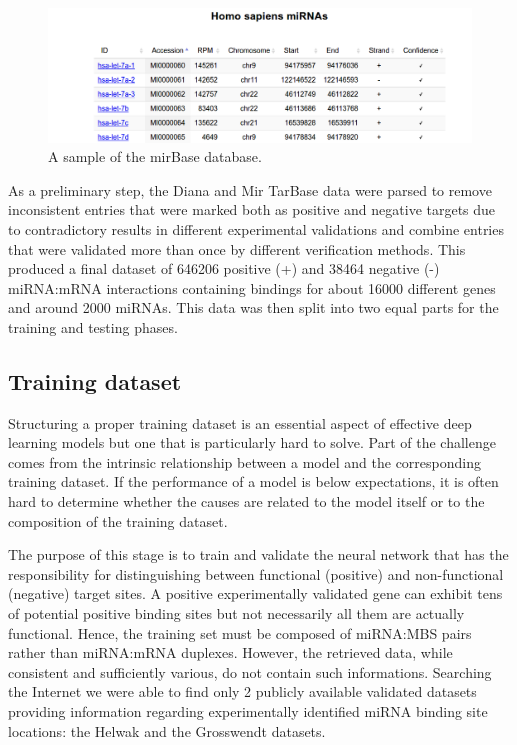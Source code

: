 \begin{figure}[hbt!]
	\centering
	\includegraphics[width=1\textwidth, height=0.3\textheight]{Figures/mirna_preview}
	\caption{A sample of the mirBase database.}
	\label{fig:mirna_preview}
\end{figure}

As a preliminary step, the Diana and Mir TarBase data were parsed to remove inconsistent entries that were marked both as positive and negative targets due to contradictory results in different experimental validations and combine entries that were validated more than once by different verification methods. This produced a final dataset of 646206 positive (+) and 38464 negative (-) miRNA:mRNA interactions containing bindings for about 16000 different genes and around 2000 miRNAs. This data was then split into two equal parts for the training and testing phases. 

\subsection{Training dataset}
Structuring a proper training dataset is an essential aspect of effective deep learning models but one that is particularly hard to solve. Part of the challenge comes from the intrinsic relationship between a model and the corresponding training dataset. If the performance of a model is below expectations, it is often hard to determine whether the causes are related to the model itself or to the composition of the training dataset.

The purpose of this stage is to train and validate the neural network that has the responsibility for distinguishing between functional (positive) and non-functional (negative) target sites. A positive experimentally validated gene can exhibit tens of potential positive binding sites  but not necessarily  all them are actually functional. Hence, the training set must be composed of miRNA:MBS pairs rather than miRNA:mRNA duplexes. However, the retrieved data, while consistent and sufficiently various, do not contain such informations. Searching the Internet we were able to find only 2 publicly available validated datasets providing information regarding experimentally identified miRNA binding site locations: the Helwak \cite{helwak} and the Grosswendt \cite{grosswendt} datasets. 

